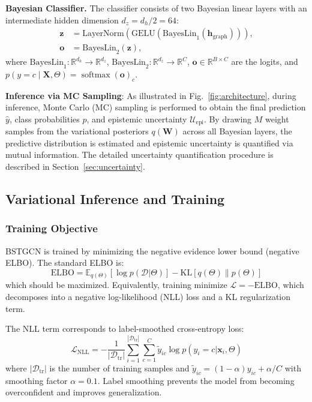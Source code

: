 \documentclass[lettersize,journal]{IEEEtran}
\DeclareMathOperator{\softmax}{softmax}
\newcommand{\BayesLin}{\mathrm{BayesLin}}
\newcommand{\GELU}{\mathrm{GELU}}
\begin{document}
\textbf{Bayesian Classifier.}
The classifier consists of two Bayesian linear layers with an intermediate hidden dimension $d_z = d_h/2 = 64$:
\begin{equation}
\begin{aligned}
\mathbf{z} &= \mathrm{LayerNorm}\!\left(\GELU\!\left(\BayesLin_1(\mathbf{h}_{\mathrm{graph}})\right)\right),\\
\mathbf{o} &= \BayesLin_2(\mathbf{z}),
\end{aligned}
\label{eq:bayes-cls}
\end{equation}
where $\BayesLin_1:\mathbb{R}^{d_h}\to\mathbb{R}^{d_z}$, $\BayesLin_2:\mathbb{R}^{d_z}\to\mathbb{R}^{C}$, $\mathbf{o}\in\mathbb{R}^{B\times C}$ are the logits, and $p(y=c\mid \mathbf{X},\Theta)=\softmax(\mathbf{o})_c$.

\textbf{Inference via MC Sampling}: As illustrated in Fig.~\ref{fig:architecture}, during inference, Monte Carlo (MC) sampling is performed to obtain the final prediction $\hat{y}$, class probabilities $\hat{p}$, and epistemic uncertainty $\mathcal{U}_{\text{epi}}$. By drawing $M$ weight samples from the variational posteriors $q(\mathbf{W})$ across all Bayesian layers, the predictive distribution is estimated and epistemic uncertainty is quantified via mutual information. The detailed uncertainty quantification procedure is described in Section~\ref{sec:uncertainty}.

\subsection{Variational Inference and Training}

\subsubsection{Training Objective}

BSTGCN is trained by minimizing the negative evidence lower bound (negative ELBO). The standard ELBO is:
\begin{equation}
\text{ELBO} = \mathbb{E}_{q(\Theta)}[\log p(\mathcal{D}|\Theta)] - \text{KL}[q(\Theta) \| p(\Theta)]
\end{equation}
which should be maximized. Equivalently, training minimize $\mathcal{L} = -\text{ELBO}$, which decomposes into a negative log-likelihood (NLL) loss and a KL regularization term.

The NLL term corresponds to label-smoothed cross-entropy loss:
\begin{equation}
\mathcal{L}_{\text{NLL}} = -\frac{1}{|\mathcal{D}_{\text{tr}}|} \sum_{i=1}^{|\mathcal{D}_{\text{tr}}|} \sum_{c=1}^C \tilde{y}_{ic} \log p(y_i=c|\mathbf{x}_i, \Theta)
\end{equation}
where $|\mathcal{D}_{\text{tr}}|$ is the number of training samples and $\tilde{y}_{ic} = (1-\alpha) y_{ic} + \alpha / C$ with smoothing factor $\alpha=0.1$. Label smoothing prevents the model from becoming overconfident and improves generalization.
\end{document}
